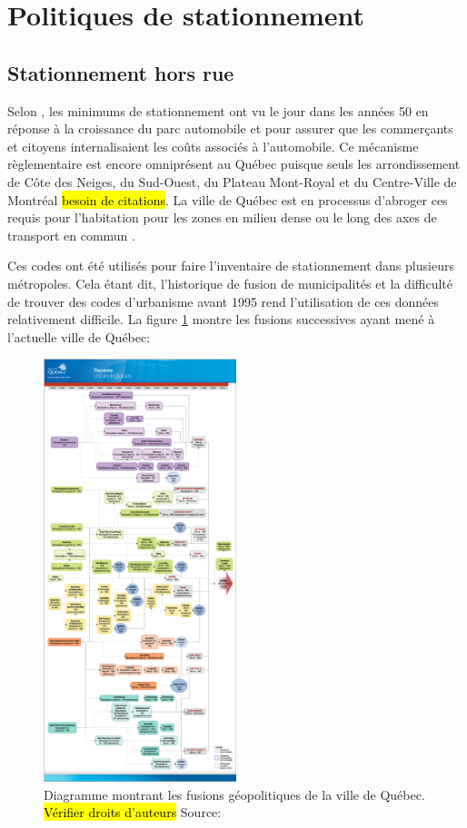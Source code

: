 \section{Politiques de stationnement}
\subsection{Stationnement hors rue}
Selon \textcite{Shoup:HighCost:2005}, les minimums de stationnement ont vu le jour dans les années 50 en réponse à la croissance du parc automobile et pour assurer que les commerçants et citoyens internalisaient les coûts associés à l'automobile. Ce mécanisme règlementaire est encore omniprésent au Québec puisque seuls les arrondissement de Côte des Neiges, du Sud-Ouest, du Plateau Mont-Royal et du Centre-Ville de Montréal \hl{besoin de citations}. La ville de Québec est en processus d'abroger ces requis pour l'habitation pour les zones en milieu dense ou le long des axes de transport en commun \parencite{VilledeQuebec:AdoptionReglement:2024}.\par

Ces codes ont été utilisés pour faire l'inventaire de stationnement dans plusieurs métropoles. Cela étant dit, l'historique de fusion de municipalités et la difficulté de trouver des codes d'urbanisme avant 1995 rend l'utilisation de ces données relativement difficile. La figure \ref{fig:historique_fusions} montre les fusions successives ayant mené à l'actuelle ville de Québec:
\begin{figure}
  \centering
  \captionsetup{justification=centering,margin=2cm}
  \includegraphics[width = 0.5\textwidth]{images/historique_fusions_VDQ.png}
  \captionsetup{justification=centering,margin=2cm}
  \caption{Diagramme montrant les fusions géopolitiques de la ville de Québec. \hl{Vérifier droits d'auteurs} Source: \cite{VilledeQuebec:ReperesChronologique:}}
  \label{fig:historique_fusions}
\end{figure}


